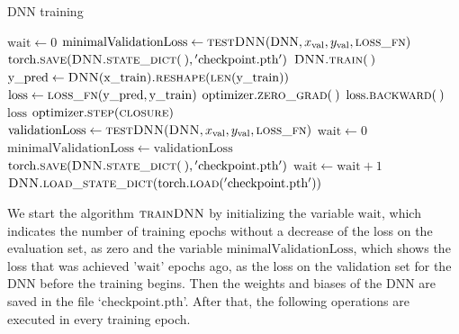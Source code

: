 \begin{algorithm}[H]%
\caption{\label{trainDNN}DNN training}
\begin{algorithmic}[1]
\State $\mathrm{wait} \gets 0$
\State $\mathrm{minimalValidationLoss} \gets \Call{testDNN}{\mathrm{DNN}, x_\mathrm{val}, y_\mathrm{val}, \textproc{loss\_fn}}$
\State $\mathrm{torch.}\Call{save}{\textproc{DNN.}\protect\Call{state\_dict}{\:}, \mathrm{'checkpoint.pth'}}$
\State\label{startTrainStep} $\textproc{DNN.}\Call{train}{\:}$
    \State $\mathrm{y\_pred} \gets \Call{DNN}{\mathrm{x\_train}}\Call{.reshape}{\protect\Call{len}{\mathrm{y\_train}}}$
    \State $\mathrm{loss} \gets \Call{loss\_fn}{\mathrm{y\_pred}, \mathrm{y\_train}}$
    \State $\mathrm{optimizer.}\Call{zero\_grad}{\:}$
    \State $\mathrm{loss.}\Call{backward}{\:}$
    \State \Return $\mathrm{loss}$
\EndFunction
\State\label{endTrainStep} $\mathrm{optimizer.}\Call{step}{\textproc{closure}}$
\State $\mathrm{validationLoss} \gets \Call{testDNN}{\textproc{DNN}, x_\mathrm{val}, y_\mathrm{val}, \textproc{loss\_fn}}$
\State $\mathrm{wait} \gets 0$
\State $\mathrm{minimalValidationLoss} \gets \mathrm{validationLoss}$
\State $\mathrm{torch.}\Call{save}{\textproc{DNN.}\protect\Call{state\_dict}{\:}, \mathrm{'checkpoint.pth'}}$
\Else
\State $\mathrm{wait} \gets \mathrm{wait}+1$
\EndIf
{}
\State $\textproc{DNN.}\Call{load\_state\_dict}{\mathrm{torch.}\protect\Call{load}{\mathrm{'checkpoint.pth'}}}$
\State \Return
\EndIf
\EndFor
\EndFunction
\end{algorithmic}
\end{algorithm}

We start the algorithm $\textproc{trainDNN}$ by initializing the variable $\mathrm{wait}$, which indicates the number of training epochs without a decrease of the loss on the evaluation set, as zero and the variable $\mathrm{minimalValidationLoss}$, which shows the loss that was achieved '$\mathrm{wait}$' epochs ago, as the loss on the validation set for the DNN before the training begins. Then the weights and biases of the DNN are saved in the file `$\mathrm{checkpoint.pth}$'. After that, the following operations are executed in every training epoch.

